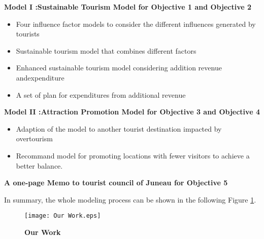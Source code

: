 \documentclass{mcmthesis}
\begin{document}
\Huge\textbullet
\normalsize{\textbf{Model I :Sustainable Tourism Model for Objective 1 and Objective 2}}
\begin{itemize}
  \item {Four influence factor models to consider the different influences generated by tourists}
  \item {Sustainable tourism model that combines different factors}
  \item {Enhanced sustainable tourism model considering addition revenue andexpenditure}
  \item {A set of plan for expenditures from additional revenue}
\end{itemize}
\Huge\textbullet
\normalsize{\textbf{Model II :Attraction Promotion Model for Objective 3 and Objective 4}}
\begin{itemize}
  \item {Adaption of the model to another tourist destination impacted by overtourism}
  \item {Recommand model for promoting locations with fewer visitors to achieve a better balance.}
\end{itemize}
\Huge\textbullet
\normalsize{\textbf{A one-page Memo to tourist council of Juneau for Objective 5}}

{In summary, the whole modeling process can be shown in the following Figure \ref{fig:Figure5}.}

\begin{figure}[H]
  \small
  \centering
  \texttt{[image: Our Work.eps]}
  \caption{\textbf{Our Work}} \label{fig:Figure5}
\end{figure}
\end{document}

